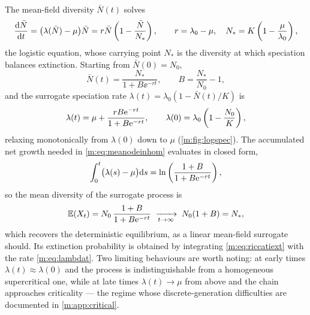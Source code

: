 The mean-field diversity $\bar N(t)$ solves
\begin{equation}
\label{m:eq:logisticode}
\frac{\mathrm{d} \bar N}{\mathrm{d} t} = \bigl(\lambda(\bar N)-\mu\bigr)\bar N
= r\bar N\left(1-\frac{\bar N}{N_\ast}\right),
\qquad
r = \lambda_0-\mu,
\quad
N_\ast = K\left(1-\frac{\mu}{\lambda_0}\right),
\end{equation}
the logistic equation, whose carrying point $N_\ast$ is the diversity at which
speciation balances extinction. Starting from $\bar N(0)=N_0$,
\begin{equation}
\label{m:eq:logisticsol}
\bar N(t) = \frac{N_\ast}{1+B\ee^{-rt}},
\qquad B = \frac{N_\ast}{N_0}-1 ,
\end{equation}
and the surrogate speciation rate $\lambda(t)=\lambda_0(1-\bar N(t)/K)$ is
\begin{equation}
\label{m:eq:lambdat}
\lambda(t) = \mu + \frac{rB\mathrm{e}^{-rt}}{1+B\mathrm{e}^{-rt}},
\qquad
\lambda(0) = \lambda_0\left(1-\frac{N_0}{K}\right),
\end{equation}
relaxing monotonically from $\lambda(0)$ down to $\mu$
(\cref{m:fig:logspec}). The accumulated net growth needed in
\cref{m:eq:meanodeinhom} evaluates in closed form,
\begin{equation}
\label{m:eq:lambdaint}
\int_0^t\bigl(\lambda(s)-\mu\bigr)\mathrm{d} s
= \ln\left(\frac{1+B}{1+B\mathrm{e}^{-rt}}\right),
\end{equation}
so the mean diversity of the surrogate process is
\begin{equation}
\label{m:eq:logspecmean}
\mathbb{E}\!\left(X_t\right) = N_0\,\frac{1+B}{1+B\mathrm{e}^{-rt}}
\;\xrightarrow[t\to\infty]{}\;
N_0(1+B) = N_\ast ,
\end{equation}
which recovers the deterministic equilibrium, as a linear mean-field surrogate
should. Its extinction probability is obtained by integrating
\cref{m:eq:riccatiext} with the rate \cref{m:eq:lambdat}. Two limiting
behaviours are worth noting: at early times $\lambda(t)\approx\lambda(0)$ and
the process is indistinguishable from a homogeneous supercritical one, while at
late times $\lambda(t)\to\mu$ from above and the chain approaches criticality
--- the regime whose discrete-generation difficulties are documented in
\cref{m:app:critical}.

